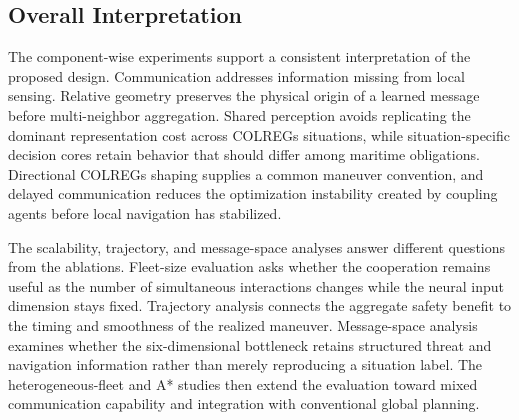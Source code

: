 \documentclass[final,5p,times,twocolumn]{elsarticle}
\begin{document}
\subsection{Overall Interpretation}
{\color{red}
The component-wise experiments support a consistent interpretation of the proposed design. Communication addresses information missing from local sensing. Relative geometry preserves the physical origin of a learned message before multi-neighbor aggregation. Shared perception avoids replicating the dominant representation cost across COLREGs situations, while situation-specific decision cores retain behavior that should differ among maritime obligations. Directional COLREGs shaping supplies a common maneuver convention, and delayed communication reduces the optimization instability created by coupling agents before local navigation has stabilized.

The scalability, trajectory, and message-space analyses answer different questions from the ablations. Fleet-size evaluation asks whether the cooperation remains useful as the number of simultaneous interactions changes while the neural input dimension stays fixed. Trajectory analysis connects the aggregate safety benefit to the timing and smoothness of the realized maneuver. Message-space analysis examines whether the six-dimensional bottleneck retains structured threat and navigation information rather than merely reproducing a situation label. The heterogeneous-fleet and A* studies then extend the evaluation toward mixed communication capability and integration with conventional global planning.
}

\end{document}
